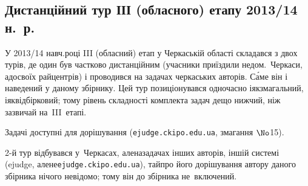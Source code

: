 \documentclass[14pt,a4paper]{extarticle}
\begin{document}
\renewenvironment{problemAllDefault}[1]{\vspace{10mm}\par\begin{problem}{#1}{Клавіатура (stdin)}{Екран (stdout)}{1 сек}{64 мегабайти}}{\end{problem}}


\subsection{Дистанційний тур ІІІ (обласного) етапу 2013/14 н.~р.}

У 2013/14 навч.\nolinebreak[3] році III (обласний) етап у Черкаській області складався з двох турів, де один був частково дистанційним (учасники приїздили не\nolinebreak[3] до\nolinebreak[3] м.~Черкаси, а\nolinebreak[3] до\nolinebreak[3] своїх райцентрів) і проводився на задачах черкаських авторів. С\'{а}ме він і наведений у даному збірнику. Цей тур позиціонувався одночасно і\nolinebreak[2] як\nolinebreak[2] змагальний, і\nolinebreak[2] як\nolinebreak[2] відбірковий; тому рівень складності комплекта задач дещо нижчий, ніж зазвичай на~III~етапі.

Задачі доступні для дорішування (\verb"ejudge.ckipo.edu.ua", змагання $\No$15). 

2-й тур відбувався у~Черкасах, але\nolinebreak[2] на\nolinebreak[2] задачах інших авторів, іншій системі (ejudge, але\nolinebreak[2] не\nolinebreak[2] \verb"ejudge.ckipo.edu.ua"), та\nolinebreak[3] й\nolinebreak[3] про його дорішування автору даного збірника нічого не\nolinebreak[3] відомо; тому він до збірника не~включений.
\end{document}
